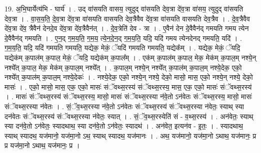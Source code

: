 \documentclass[17pt]{extarticle}
\begin{document}
19. अ॒भि॒घार्येत्य॑भि - घार्य॑ । . उद् वा॑सयति वासय॒ त्युदुद् वा॑सयति देव॒त्रा दे॑व॒त्रा वा॑सय॒ त्युदुद् वा॑सयति देव॒त्रा । . वा॒स॒य॒ति॒ दे॒व॒त्रा दे॑व॒त्रा वा॑सयति वासयति देव॒त्रैवैव दे॑व॒त्रा वा॑सयति वासयति देव॒त्रैव । . दे॒व॒त्रैवैव दे॑व॒त्रा दे॑व॒ त्रैवैन॑ देनदे॒व दे॑व॒त्रा दे॑व॒त्रैवैन॑त् । . दे॒व॒त्रेति॑ देव - त्रा । . ए॒वैन॑ देन दे॒वैवैन॑द् गमयति गमय त्येन दे॒वैवैन॑द् गमयति । . ए॒न॒द् ग॒म॒य॒ति॒ ग॒म॒य॒ त्ये॒न॒दे॒न॒द् ग॒म॒य॒ति॒ यदि॒ यदि॑ गमय त्येनदेनद् गमयति॒ यदि॑ । . ग॒म॒य॒ति॒ यदि॒ यदि॑ गमयति गमयति॒ यद्येक॒ मेकं॒ ॅयदि॑ गमयति गमयति॒ यद्येक᳚म् । . यद्येक॒ मेकं॒ ॅयदि॒ यद्येक॑म् क॒पाल॑म् क॒पाल॒ मेकं॒ ॅयदि॒ यद्येक॑म् क॒पाल᳚म् । . एक॑म् क॒पाल॑म् क॒पाल॒ मेक॒ मेक॑म् क॒पाल॒म् नश्ये॒न् नश्ये᳚त् क॒पाल॒ मेक॒ मेक॑म् क॒पाल॒म् नश्ये᳚त् । . क॒पाल॒म् नश्ये॒न् नश्ये᳚त् क॒पाल॑म् क॒पाल॒म् नश्ये॒देक॒ एको॒ नश्ये᳚त् क॒पाल॑म् क॒पाल॒म् नश्ये॒देकः॑ । . नश्ये॒देक॒ एको॒ नश्ये॒न् नश्ये॒ देको॒ मासो॒ मास॒ एको॒ नश्ये॒न् नश्ये॒ देको॒ मासः॑ । . एको॒ मासो॒ मास॒ एक॒ एको॒ मासः॑ संॅवथ्स॒रस्य॑ संॅवथ्स॒रस्य॒ मास॒ एक॒ एको॒ मासः॑ संॅवथ्स॒रस्य॑ । . मासः॑ संॅवथ्स॒रस्य॑ संॅवथ्स॒रस्य॒ मासो॒ मासः॑ संॅवथ्स॒रस्या न॑वे॒तो ऽन॑वेतः संॅवथ्स॒रस्य॒ मासो॒ मासः॑ संॅवथ्स॒रस्या न॑वेतः । . सं॒ॅव॒थ्स॒रस्या न॑वे॒तो ऽन॑वेतः संॅवथ्स॒रस्य॑ संॅवथ्स॒रस्या न॑वेतः॒ स्याथ् स्या दन॑वेतः संॅवथ्स॒रस्य॑ संॅवथ्स॒रस्या न॑वेतः॒ स्यात् । . सं॒ॅव॒थ्स॒रस्येति॑ सं - व॒थ्स॒रस्य॑ । . अन॑वेतः॒ स्याथ् स्या दन॑वे॒तो ऽन॑वेतः॒ स्यादथाथ॒ स्या दन॑वे॒तो ऽन॑वेतः॒ स्यादथ॑ । . अन॑वेत॒ इत्यन॑व - इ॒तः॒ । . स्यादथाथ॒ स्याथ् स्यादथ॒ यज॑मानो॒ यज॑मा॒नो ऽथ॒ स्याथ् स्यादथ॒ यज॑मानः । . अथ॒ यज॑मानो॒ यज॑मा॒नो ऽथाथ॒ यज॑मानः॒ प्र प्र यज॑मा॒नो ऽथाथ॒ यज॑मानः॒ प्र । \newline
\end{document}
